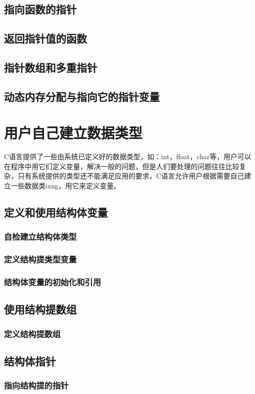 \section{指向函数的指针}
\section{返回指针值的函数}
\section{指针数组和多重指针}
\section{动态内存分配与指向它的指针变量}

\chapter{用户自己建立数据类型}
C语言提供了一些由系统已定义好的数据类型，如：int，float，char等，用户可以在程序中用它们定义变量，解决一般的问题，但是人们要处理的问题往往比较复杂，只有系统提供的类型还不能满足应用的要求，C语言允许用户根据需要自己建立一些数据类ixng，用它来定义变量。
\section{定义和使用结构体变量}
\subsection{自检建立结构体类型}
\subsection{定义结构提类型变量}
\subsection{结构体变量的初始化和引用}
\section{使用结构提数组}
\subsection{定义结构提数组}
\section{结构体指针}
\subsection{指向结构提的指针}
